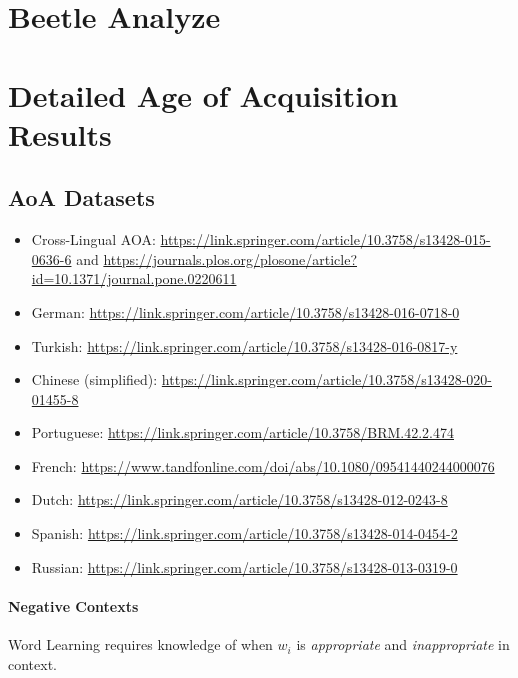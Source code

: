 \newpage 
\section{Beetle Analyze}\label{sec:beetle-analyze}

\section{Detailed Age of Acquisition Results}\label{sec:aoa-results}

\subsection{AoA Datasets}



\begin{itemize}
    \item Cross-Lingual AOA: \url{https://link.springer.com/article/10.3758/s13428-015-0636-6} and \url{https://journals.plos.org/plosone/article?id=10.1371/journal.pone.0220611}
    \item German: \url{https://link.springer.com/article/10.3758/s13428-016-0718-0}
    \item Turkish: \url{https://link.springer.com/article/10.3758/s13428-016-0817-y}
    \item Chinese (simplified): \url{https://link.springer.com/article/10.3758/s13428-020-01455-8}
    \item Portuguese: \url{https://link.springer.com/article/10.3758/BRM.42.2.474}
    \item French: \url{https://www.tandfonline.com/doi/abs/10.1080/09541440244000076}
    \item Dutch: \url{https://link.springer.com/article/10.3758/s13428-012-0243-8}
    \item Spanish: \url{https://link.springer.com/article/10.3758/s13428-014-0454-2}
    \item Russian: \url{https://link.springer.com/article/10.3758/s13428-013-0319-0}
\end{itemize}




\paragraph{Negative Contexts} Word Learning requires knowledge of when \(w_i\) is \textit{appropriate} and \textit{inappropriate} in context.




